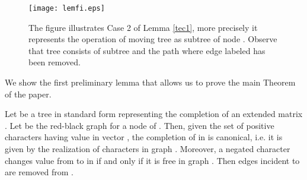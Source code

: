 \documentclass{llncs}
\begin{document}
\begin{figure}[ptb]
\begin{center}
\texttt{[image: lemfi.eps]}
\end{center}
\caption{The figure illustrates Case 2 of  Lemma \ref{tec1}, more precisely it represents the operation of  moving tree   as subtree of node . Observe that tree  consists of subtree   and the path  where edge  labeled  has been removed.}
\label{lemfi}
\end{figure}


We show the first preliminary lemma that allows us to prove the main Theorem of the paper.



\begin{lemma}
\label{prelim-annotated}
Let  be a tree in standard form representing the completion  of an extended matrix . Let  be the red-black graph for a node  of .
 Then, given  the set of positive characters having value  in vector , the completion of  in  is canonical, i.e. it is given by the realization of characters  in graph   .   Moreover,  a negated character   changes value from  to  in  if and only if it is free in graph . Then edges incident to   are removed from .

\end{lemma}
\end{document}
